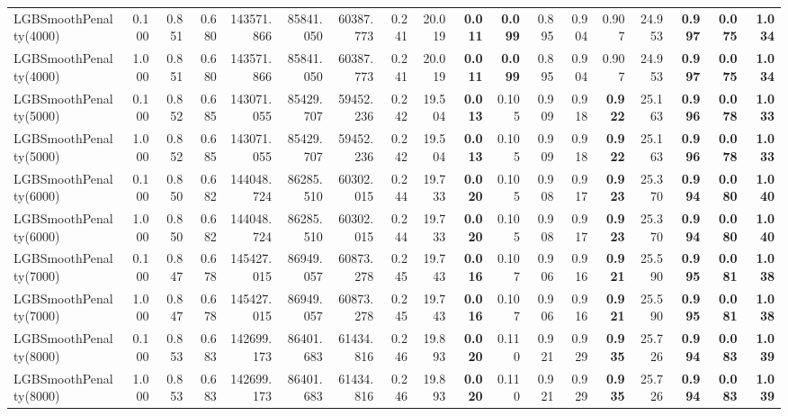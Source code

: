\documentclass[11pt]{article}
\theoremstyle{plain}
\theoremstyle{definition}
\newcommand{\1}{\mathbf{1}}
\begin{document}
\begin{table}[htbp]
{\begin{tabular}{lrrrrrrrrrrrrrrrrr}
LGBSmoothPenalty(4000) & 0.100 & 0.851 & 0.680 & 143571.866 & 85841.050 & 60387.773 & 0.241 & 20.019 & \textbf{0.011} & \textbf{0.099} & 0.895 & 0.904 & 0.907 & 24.953 & \textbf{0.997} & \textbf{0.075} & \textbf{1.034} \\
LGBSmoothPenalty(4000) & 1.000 & 0.851 & 0.680 & 143571.866 & 85841.050 & 60387.773 & 0.241 & 20.019 & \textbf{0.011} & \textbf{0.099} & 0.895 & 0.904 & 0.907 & 24.953 & \textbf{0.997} & \textbf{0.075} & \textbf{1.034} \\
LGBSmoothPenalty(5000) & 0.100 & 0.852 & 0.685 & 143071.055 & 85429.707 & 59452.236 & 0.242 & 19.504 & \textbf{0.013} & 0.105 & 0.909 & 0.918 & \textbf{0.922} & 25.163 & \textbf{0.996} & \textbf{0.078} & \textbf{1.033} \\
LGBSmoothPenalty(5000) & 1.000 & 0.852 & 0.685 & 143071.055 & 85429.707 & 59452.236 & 0.242 & 19.504 & \textbf{0.013} & 0.105 & 0.909 & 0.918 & \textbf{0.922} & 25.163 & \textbf{0.996} & \textbf{0.078} & \textbf{1.033} \\
LGBSmoothPenalty(6000) & 0.100 & 0.850 & 0.682 & 144048.724 & 86285.510 & 60302.015 & 0.244 & 19.733 & \textbf{0.020} & 0.105 & 0.908 & 0.917 & \textbf{0.923} & 25.370 & \textbf{0.994} & \textbf{0.080} & \textbf{1.040} \\
LGBSmoothPenalty(6000) & 1.000 & 0.850 & 0.682 & 144048.724 & 86285.510 & 60302.015 & 0.244 & 19.733 & \textbf{0.020} & 0.105 & 0.908 & 0.917 & \textbf{0.923} & 25.370 & \textbf{0.994} & \textbf{0.080} & \textbf{1.040} \\
LGBSmoothPenalty(7000) & 0.100 & 0.847 & 0.678 & 145427.015 & 86949.057 & 60873.278 & 0.245 & 19.743 & \textbf{0.016} & 0.107 & 0.906 & 0.916 & \textbf{0.921} & 25.590 & \textbf{0.995} & \textbf{0.081} & \textbf{1.038} \\
LGBSmoothPenalty(7000) & 1.000 & 0.847 & 0.678 & 145427.015 & 86949.057 & 60873.278 & 0.245 & 19.743 & \textbf{0.016} & 0.107 & 0.906 & 0.916 & \textbf{0.921} & 25.590 & \textbf{0.995} & \textbf{0.081} & \textbf{1.038} \\
LGBSmoothPenalty(8000) & 0.100 & 0.853 & 0.683 & 142699.173 & 86401.683 & 61434.816 & 0.246 & 19.893 & \textbf{0.020} & 0.110 & 0.921 & 0.929 & \textbf{0.935} & 25.726 & \textbf{0.994} & \textbf{0.083} & \textbf{1.039} \\
LGBSmoothPenalty(8000) & 1.000 & 0.853 & 0.683 & 142699.173 & 86401.683 & 61434.816 & 0.246 & 19.893 & \textbf{0.020} & 0.110 & 0.921 & 0.929 & \textbf{0.935} & 25.726 & \textbf{0.994} & \textbf{0.083} & \textbf{1.039} \\

\end{tabular}}
\end{table}
\end{document}
